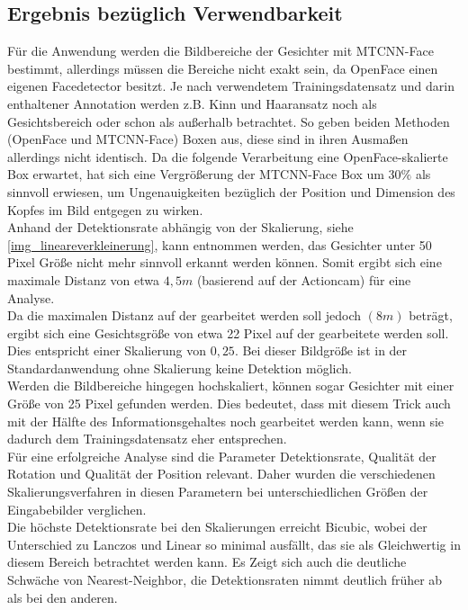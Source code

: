 \subsection{Ergebnis bezüglich Verwendbarkeit}
Für die Anwendung werden die Bildbereiche der Gesichter mit MTCNN-Face bestimmt, allerdings müssen die Bereiche nicht exakt sein, da OpenFace einen eigenen Facedetector besitzt. Je nach verwendetem Trainingsdatensatz und darin enthaltener Annotation werden z.B. Kinn und Haaransatz noch als Gesichtsbereich oder schon als außerhalb betrachtet. So geben beiden Methoden (OpenFace und MTCNN-Face) Boxen aus, diese sind in ihren Ausmaßen allerdings nicht identisch. Da die folgende Verarbeitung eine OpenFace-skalierte Box erwartet, hat sich eine Vergrößerung der MTCNN-Face Box um $30\%$ als sinnvoll erwiesen, um Ungenauigkeiten bezüglich der Position und Dimension des Kopfes im Bild entgegen zu wirken.\\
Anhand der Detektionsrate abhängig von der Skalierung, siehe \autoref{img_lineareverkleinerung}, kann entnommen werden, das Gesichter unter 50 Pixel Größe nicht mehr sinnvoll erkannt werden können. Somit ergibt sich eine maximale Distanz von etwa $4,5m$ (basierend auf der Actioncam) für eine Analyse.\\
Da die maximalen Distanz auf der gearbeitet werden soll jedoch $(8m)$ beträgt, ergibt sich eine Gesichtsgröße von etwa 22 Pixel auf der gearbeitete werden soll. Dies entspricht einer Skalierung von $0,25$. Bei dieser Bildgröße ist in der Standardanwendung ohne Skalierung keine Detektion möglich.\\
Werden die Bildbereiche hingegen hochskaliert, können sogar Gesichter mit einer Größe von 25 Pixel gefunden werden. Dies bedeutet, dass mit diesem Trick auch mit der Hälfte des Informationsgehaltes noch gearbeitet werden kann, wenn sie dadurch dem Trainingsdatensatz eher entsprechen.\\
Für eine erfolgreiche Analyse sind die Parameter Detektionsrate, Qualität der Rotation und Qualität der Position relevant. Daher wurden die verschiedenen Skalierungsverfahren in diesen Parametern bei unterschiedlichen Größen der Eingabebilder verglichen.\\
Die höchste Detektionsrate bei den Skalierungen erreicht Bicubic, wobei der Unterschied zu Lanczos und Linear so minimal ausfällt, das sie als Gleichwertig in diesem Bereich betrachtet werden kann. Es Zeigt sich auch die deutliche Schwäche von Nearest-Neighbor, die Detektionsraten nimmt deutlich früher ab als bei den anderen.\\
